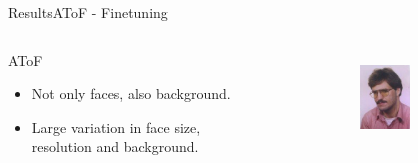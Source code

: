 \begin{frame}{Results}{AToF - Finetuning}
    \begin{columns}
        \begin{block}{AToF}
            \begin{itemize}
                \item Not only faces, also background.
                \item Large variation in face size, resolution and background.
           \end{itemize}
        \end{block}
        \begin{figure}
            \centering
            \begin{subfigure}[b]{0.4\textwidth}
                \includegraphics[width=0.7\textwidth]{sections/malte_slides/atof1}
            \end{subfigure}
            \begin{subfigure}[b]{0.45\textwidth}

\end{subfigure}
\end{figure}
\end{columns}
\end{frame}
